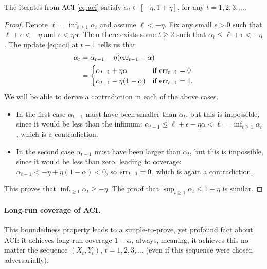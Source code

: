 \documentclass{article}
\begin{document}
\begin{lemma}
\label{lem:aci_bounded}
The iterates from ACI \eqref{eq:aci} satisfy $\alpha_t \in [-\eta, 1+\eta]$, for
any $t=1,2,3,\ldots$.  
\end{lemma}

\begin{proof}
Denote $\ell = \inf_{t \geq 1} \alpha_t$ and assume $\ell < -\eta$. Fix any
small $\epsilon>0$ such that $\ell + \epsilon < -\eta$ and $\epsilon <
\eta\alpha$. Then there exists some $t \geq 2$ such that $\alpha_t  \leq \ell +
\epsilon < -\eta$. The update \eqref{eq:aci} at $t-1$ tells us that 
\begin{align*}
\alpha_t &= \alpha_{t-1} - \eta(\mathrm{err}_{t-1} - \alpha) \\
&= \begin{cases} 
\alpha_{t-1} + \eta\alpha & \text{if $\mathrm{err}_{t-1} = 0$} \\ 
\alpha_{t-1} - \eta(1-\alpha) & \text{if $\mathrm{err}_{t-1} = 1$}. 
\end{cases}
\end{align*}
We will be able to derive a contradiction in each of the above cases. 
\begin{itemize}
\item In the first case $\alpha_{t-1}$ must have been smaller than $\alpha_t$,
  but this is impossible, since it would be less than the infimum:
  $\alpha_{t-1} \leq \ell + \epsilon - \eta\alpha < \ell = \inf_{t \geq 1}
  \alpha_t$, which is a contradiction.           
\item In the second case $\alpha_{t-1}$ must have been larger than $\alpha_t$,
  but this is impossible, since it would be less than zero, leading to coverage: 
  $\alpha_{t-1} <  -\eta + \eta(1-\alpha) < 0$, so $\mathrm{err}_{t-1}=0$, which is
  again a contradiction.        
\end{itemize}
This proves that $\inf_{t \geq 1} \alpha_t \geq -\eta$. The proof that $\sup_{t
  \geq 1} \alpha_t \leq 1+\eta$ is similar.      
\end{proof}

\paragraph{Long-run coverage of ACI.}

This boundedness property leads to a simple-to-prove, yet profound fact about
ACI: it achieves long-run coverage $1-\alpha$, always, meaning, it achieves this
no matter the sequence $(X_t,Y_t)$, $t=1,2,3,\ldots$ (even if this sequence were
chosen adversarially).  
\end{document}
